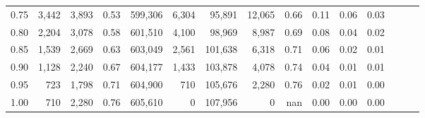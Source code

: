 \begin{tabular}{rrrrrrrrrrrrrrr}
0.75 &   3,442 &   3,893 &  0.53 &  599,306 &    6,304 &   95,891 &   12,065 &  0.66 &  0.11 &  0.06 &      0.03 \\
0.80 &   2,204 &   3,078 &  0.58 &  601,510 &    4,100 &   98,969 &    8,987 &  0.69 &  0.08 &  0.04 &      0.02 \\
0.85 &   1,539 &   2,669 &  0.63 &  603,049 &    2,561 &  101,638 &    6,318 &  0.71 &  0.06 &  0.02 &      0.01 \\
0.90 &   1,128 &   2,240 &  0.67 &  604,177 &    1,433 &  103,878 &    4,078 &  0.74 &  0.04 &  0.01 &      0.01 \\
0.95 &     723 &   1,798 &  0.71 &  604,900 &      710 &  105,676 &    2,280 &  0.76 &  0.02 &  0.01 &      0.00 \\
1.00 &     710 &   2,280 &  0.76 &  605,610 &        0 &  107,956 &        0 &   nan &  0.00 &  0.00 &      0.00 \\
\bottomrule
\end{tabular}

